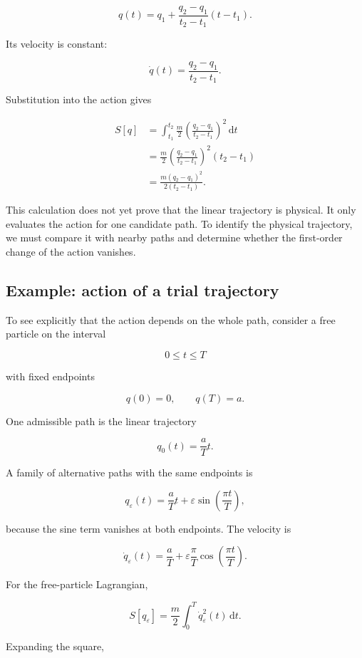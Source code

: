 \[
q(t)
=
q_{1}
+
\frac{q_{2}-q_{1}}{t_{2}-t_{1}}
(t-t_{1}).
\]

Its velocity is constant:

\[
\dot q(t)
=
\frac{q_{2}-q_{1}}{t_{2}-t_{1}}.
\]

Substitution into the action gives

\[
\begin{aligned}
S[q]
&=
\int_{t_{1}}^{t_{2}}
\frac{m}{2}
\left(
\frac{q_{2}-q_{1}}{t_{2}-t_{1}}
\right)^{2}
\,\mathrm{d}t\\
&=
\frac{m}{2}
\left(
\frac{q_{2}-q_{1}}{t_{2}-t_{1}}
\right)^{2}
(t_{2}-t_{1})\\
&=
\boxed{
\frac{m(q_{2}-q_{1})^{2}}{2(t_{2}-t_{1})}
}.
\end{aligned}
\]

This calculation does not yet prove that the linear trajectory is physical. It only evaluates the action for one candidate path. To identify the physical trajectory, we must compare it with nearby paths and determine whether the first-order change of the action vanishes.

\subsection{Example: action of a trial trajectory}

To see explicitly that the action depends on the whole path, consider a free particle on the interval

\[
0\leq t\leq T
\]

with fixed endpoints

\[
q(0)=0,
\qquad
q(T)=a.
\]

One admissible path is the linear trajectory

\[
q_{0}(t)=\frac{a}{T}t.
\]

A family of alternative paths with the same endpoints is

\[
q_{\varepsilon}(t)
=
\frac{a}{T}t
+
\varepsilon
\sin\left(\frac{\pi t}{T}\right),
\]

because the sine term vanishes at both endpoints. The velocity is

\[
\dot q_{\varepsilon}(t)
=
\frac{a}{T}
+
\varepsilon\frac{\pi}{T}
\cos\left(\frac{\pi t}{T}\right).
\]

For the free-particle Lagrangian,

\[
S[q_{\varepsilon}]
=
\frac{m}{2}
\int_{0}^{T}
\dot q_{\varepsilon}^{2}(t)
\,\mathrm{d}t.
\]

Expanding the square,

